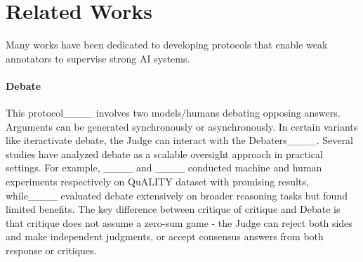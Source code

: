 \section{Related Works}




Many works have been dedicated to developing protocols that enable weak annotators to supervise strong AI systems.

\paragraph{Debate} This protocol____ involves two models/humans debating opposing answers. Arguments can be generated synchronously or asynchronously. In certain variants like iteractivate debate, the Judge can interact with the Debaters____. Several studies have analyzed debate as a scalable oversight approach in practical settings. For example, ____ and ____ conducted machine and human experiments respectively on QuALITY dataset with promising results, while____ evaluated debate extensively on broader reasoning tasks but found limited benefits. The key difference between critique of critique and Debate is that critique does not assume a zero-sum game - the Judge can reject both sides and make independent judgments, or accept consensus answers from both response or critiques.

